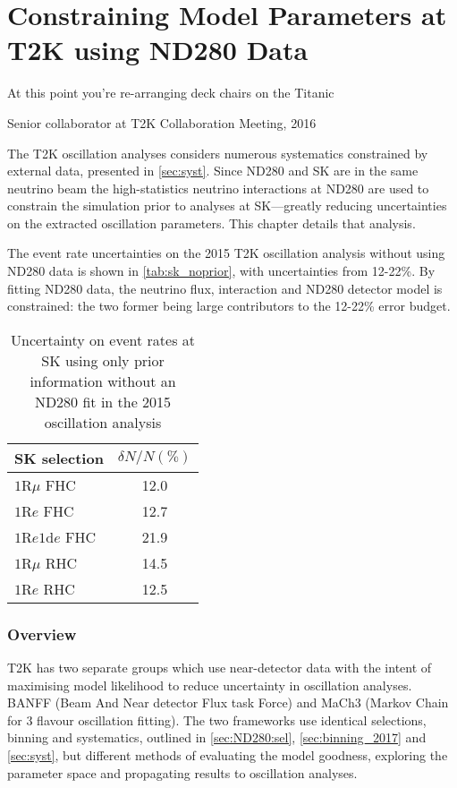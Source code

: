 \chapter{Constraining Model Parameters at T2K using ND280 Data}
\label{chap:ND280}

\epigraph{At this point you're re-arranging deck chairs on the Titanic}{Senior collaborator at T2K Collaboration Meeting, 2016}

The T2K oscillation analyses considers numerous systematics constrained by external data, presented in \autoref{sec:syst}. Since ND280 and SK are in the same neutrino beam the high-statistics neutrino interactions at ND280 are used to constrain the simulation prior to analyses at SK---greatly reducing uncertainties on the extracted oscillation parameters. This chapter details that analysis.

The event rate uncertainties on the 2015 T2K oscillation analysis without using ND280 data is shown in \autoref{tab:sk_noprior}, with uncertainties from 12-22\%. By fitting ND280 data, the neutrino flux, interaction and ND280 detector model is constrained: the two former being large contributors to the 12-22\% error budget.
\begin{table}[h]
	\begin{tabular}{l | c}
		\hline
		\hline
		SK selection & $\delta N/N (\%)$ \\
		\hline
		$1\text{R}\mu$ FHC & 12.0 \\
		$1\text{R}e$ FHC & 12.7 \\
		$1\text{R}e1\text{d}e$ FHC & 21.9 \\
		\hline
		$1\text{R}\mu$ RHC & 14.5 \\
		$1\text{R}e$ RHC & 12.5 \\
		\hline
		\hline
	\end{tabular}
	\caption{Uncertainty on event rates at SK using only prior information without an ND280 fit in the 2015 oscillation analysis\cite{t2k_2015}}
	\label{tab:sk_noprior}
\end{table}

\subsection{Overview}
T2K has two separate groups which use near-detector data with the intent of maximising model likelihood to reduce uncertainty in oscillation analyses. BANFF (Beam And Near detector Flux task Force) and MaCh3 (Markov Chain for 3 flavour oscillation fitting). The two frameworks use identical selections, binning and systematics, outlined in \autoref{sec:ND280:sel}, \autoref{sec:binning_2017} and \autoref{sec:syst}, but different methods of evaluating the model goodness, exploring the parameter space and propagating results to oscillation analyses.

